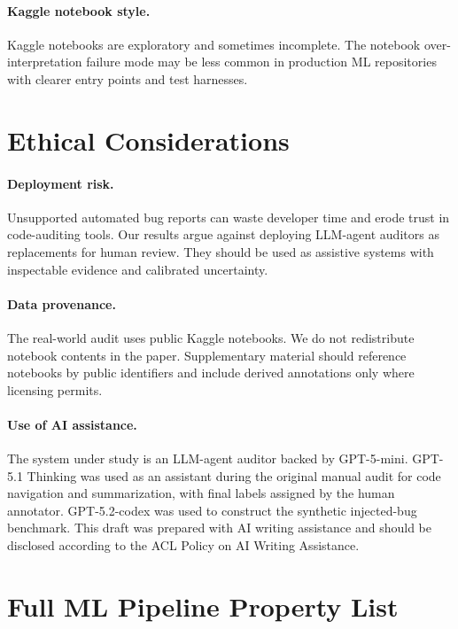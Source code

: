 \documentclass[11pt]{article}
\begin{document}
\paragraph{Kaggle notebook style.}
Kaggle notebooks are exploratory and sometimes incomplete.
The notebook over-interpretation failure mode may be less common in production ML repositories with clearer entry points and test harnesses.

\section*{Ethical Considerations}

\paragraph{Deployment risk.}
Unsupported automated bug reports can waste developer time and erode trust in code-auditing tools.
Our results argue against deploying LLM-agent auditors as replacements for human review.
They should be used as assistive systems with inspectable evidence and calibrated uncertainty.

\paragraph{Data provenance.}
The real-world audit uses public Kaggle notebooks.
We do not redistribute notebook contents in the paper.
Supplementary material should reference notebooks by public identifiers and include derived annotations only where licensing permits.

\paragraph{Use of AI assistance.}
The system under study is an LLM-agent auditor backed by GPT-5-mini.
GPT-5.1 Thinking was used as an assistant during the original manual audit for code navigation and summarization, with final labels assigned by the human annotator.
GPT-5.2-codex was used to construct the synthetic injected-bug benchmark.
This draft was prepared with AI writing assistance and should be disclosed according to the ACL Policy on AI Writing Assistance.




\appendix

\section{Full ML Pipeline Property List}
\label{app:properties}
\end{document}
